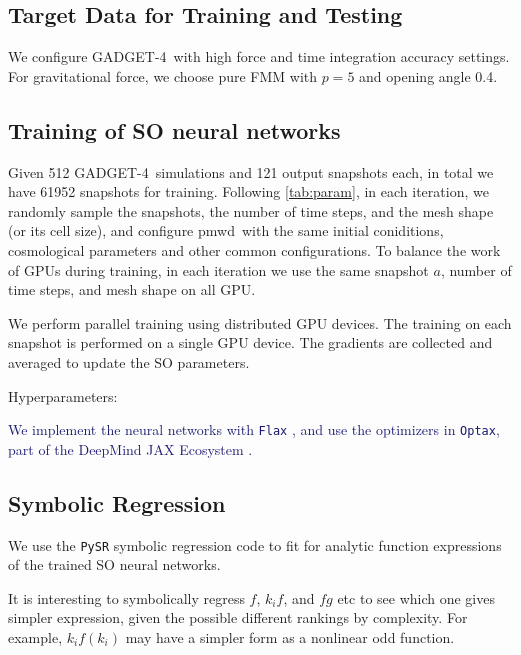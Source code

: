 \documentclass[modern, trackchanges, dvipsnames]{aastex631}
\newcommand{\pmwd}{{\usefont{T1}{nova}{m}{sl}pmwd}}
\newcommand{\GADGET}{{{\fontsize{10pt}{12pt}\selectfont GADGET}-4}}
\newcommand{\YL}[1]{\textcolor{Bittersweet}{#1}}
\newcommand{\YZ}[1]{\textcolor{MidnightBlue}{#1}}
\begin{document}
\vspace{1em}
\subsection{Target Data for Training and Testing}

\citet{GADGET-4}

We configure \GADGET\ with high force and time integration accuracy
settings.
For gravitational force, we choose pure FMM with $p=5$ and opening angle
0.4.


\vspace{1em}
\subsection{Training of SO neural networks}

Given 512 \GADGET\ simulations and 121 output snapshots each, in total
we have 61952 snapshots for training.
Following \autoref{tab:param}, in each iteration, we randomly sample the
snapshots, the number of time steps, and the mesh shape (or its cell
size), and configure \pmwd\ with the same initial coniditions,
cosmological parameters and other common configurations.
To balance the work of GPUs during training, in each iteration we use
the same snapshot $a$, number of time steps, and mesh shape on all GPU.

We perform parallel training using distributed GPU devices.
The training on each snapshot is performed on a single GPU device.
The gradients are collected and averaged to update the SO parameters.

Hyperparameters:

\YZ{
We implement the neural networks with \texttt{Flax} \citep{flax2020github}, and
use the optimizers in \texttt{Optax}, part of the DeepMind JAX Ecosystem
\citep{deepmind2020jax}.
}


\vspace{1em}
\subsection{Symbolic Regression}

We use the \texttt{PySR} \citep{Cranmer2023} symbolic regression code to fit for
analytic function expressions of the trained SO neural networks.

\YL{It is interesting to symbolically regress $f$, $k_i f$, and $f g$
etc to see which one gives simpler expression, given the possible
different rankings by complexity.
For example, $k_i f(k_i)$ may have a simpler form as a nonlinear odd
function.}
\end{document}
